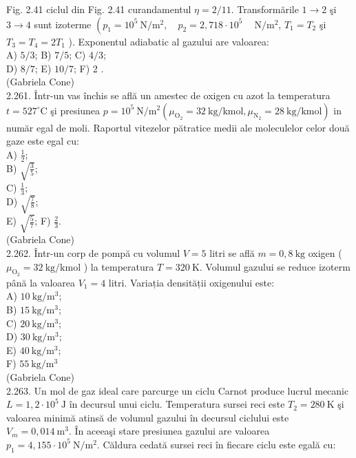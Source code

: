 \documentclass[10pt]{article}
\begin{document}
Fig. 2.41 ciclul din Fig. 2.41 curandamentul $\eta=2 / 11$. Transformările $1 \rightarrow 2$ şi $3 \rightarrow 4$ sunt izoterme $\left(p_{1}=10^{5} \mathrm{~N} / \mathrm{m}^{2}, \quad p_{2}=2,718 \cdot 10^{5} \quad \mathrm{~N} / \mathrm{m}^{2}\right.$, $T_{1}=T_{2}$ şi $T_{3}=T_{4}=2 T_{1}$ ). Exponentul adiabatic al gazului are valoarea:\\
A) $5 / 3$; B) $7 / 5$; C) $4 / 3$;\\
D) $8 / 7$; E) $10 / 7$; F) 2 .\\
(Gabriela Cone)\\
2.261. Într-un vas închis se află un amestec de oxigen cu azot la temperatura $t=527^{\circ} \mathrm{C}$ şi presiunea $p=10^{5} \mathrm{~N} / \mathrm{m}^{2}\left(\mu_{\mathrm{O}_{2}}=32 \mathrm{~kg} / \mathrm{kmol}, \mu_{\mathrm{N}_{2}}=28 \mathrm{~kg} / \mathrm{kmol}\right)$ in număr egal de moli. Raportul vitezelor pătratice medii ale moleculelor celor două gaze este egal cu:\\
A) $\frac{1}{2}$;\\
B) $\sqrt{\frac{3}{5}}$;\\
C) $\frac{1}{3}$;\\
D) $\sqrt{\frac{7}{8}}$;\\
E) $\sqrt{\frac{5}{7}}$; F) $\frac{2}{3}$.\\
(Gabriela Cone)\\
2.262. Într-un corp de pompă cu volumul $V=5$ litri se află $m=0,8 \mathrm{~kg}$ oxigen ( $\mu_{\mathrm{O}_{2}}=32 \mathrm{~kg} / \mathrm{kmol}$ ) la temperatura $T=320 \mathrm{~K}$. Volumul gazului se reduce izoterm până la valoarea $V_{1}=4$ litri. Variația densității oxigenului este:\\
A) $10 \mathrm{~kg} / \mathrm{m}^{3}$;\\
B) $15 \mathrm{~kg} / \mathrm{m}^{3}$;\\
C) $20 \mathrm{~kg} / \mathrm{m}^{3}$;\\
D) $30 \mathrm{~kg} / \mathrm{m}^{3}$;\\
E) $40 \mathrm{~kg} / \mathrm{m}^{3}$;\\
F) $55 \mathrm{~kg} / \mathrm{m}^{3}$\\
(Gabriela Cone)\\
2.263. Un mol de gaz ideal care parcurge un ciclu Carnot produce lucrul mecanic $L=1,2 \cdot 10^{5} \mathrm{~J}$ în decursul unui ciclu. Temperatura sursei reci este $T_{2}=280 \mathrm{~K}$ şi valoarea minimă atinsă de volumul gazului în decursul ciclului este $V_{m}=0,014 \mathrm{~m}^{3}$. În aceeaşi stare presiunea gazului are valoarea $p_{1}=4,155 \cdot 10^{5} \mathrm{~N} / \mathrm{m}^{2}$. Căldura cedată sursei reci în fiecare ciclu este egală cu:\\
\end{document}
